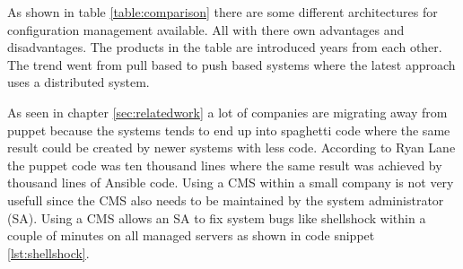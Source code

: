 As shown in table \ref{table:comparison} there are some different architectures for configuration management available. All with there own advantages and disadvantages. The products in the table are introduced years from each other. The trend went from pull based to push based systems where the latest approach uses a distributed system.

As seen in chapter \ref{sec:relatedwork} a lot of companies are migrating away from puppet because the systems tends to end up into spaghetti code \cite{movingawayfrompuppet} where the same result could be created by newer systems with less code. According to Ryan Lane \cite{movingawayfrompuppet} the puppet code was ten thousand lines where the same result was achieved by thousand lines of Ansible code. Using a CMS within a small company is not very usefull since the CMS also needs to be maintained by the system administrator (SA). Using a CMS allows an SA to fix system bugs like shellshock within a couple of minutes on all managed servers as shown in code snippet \ref{lst:shellshock}.

